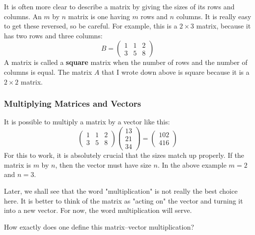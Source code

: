 \documentclass[10pt,]{book}
\newcommand{\terminology}[1]{\textbf{#1}}
\theoremstyle{plain}
\theoremstyle{definition}
\numberwithin{equation}{section}
\begin{document}
      It is often more clear to describe a matrix by giving the sizes of its
      rows and columns. An \(m\) by \(n\) matrix is one having \(m\)
      rows and \(n\) columns. It is really easy to get these reversed, so be
      careful. For example, this is a \(2\times 3\) matrix, because it has
      two rows and three columns:\[
        B = \begin{pmatrix} 1 & 1 & 2 \\ 3 & 5 & 8 \end{pmatrix}
      \]
      A matrix is called a \terminology{square} matrix when the number of rows and
      the number of columns is equal. The matrix \(A\) that I wrote down
      above is square because it is a \(2\times 2\) matrix.
\typeout{************************************************}
\typeout{************************************************}
\subsubsection[Multiplying Matrices and Vectors]{Multiplying Matrices and Vectors}\label{subsubsection-4}

        It is possible to multiply a matrix by a vector like this:\[
          \begin{pmatrix} 1 & 1 & 2 \\ 3 & 5 & 8 \end{pmatrix}
          \begin{pmatrix} 13 \\ 21 \\ 34 \end{pmatrix} =
          \begin{pmatrix} 102 \\ 416 \end{pmatrix}
        \]
        For this to work, it is absolutely crucial that the sizes match up
        properly. If the matrix is \(m\) by \(n\), then the vector must have
        size \(n\). In the above example \(m = 2\) and \(n=3\).
\par

        Later, we shall see that the word "multiplication" is not really the
        best choice here. It is better to think of the matrix as "acting on"
        the vector and turning it into a new vector. For now, the word
        multiplication will serve.
\par

        How exactly does one define this matrix--vector multiplication?
\typeout{************************************************}
\typeout{************************************************}
\end{document}
